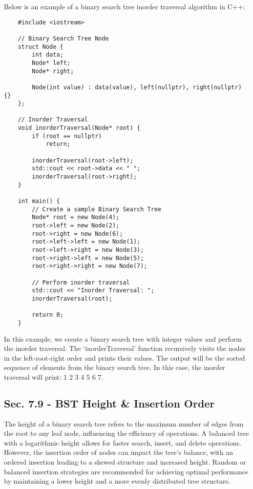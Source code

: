 \begin{solution}
    Below is an example of a binary search tree inorder traversal algorithm in C++:

    \horizontalline

    \begin{verbatim}
    #include <iostream>

    // Binary Search Tree Node
    struct Node {
        int data;
        Node* left;
        Node* right;
    
        Node(int value) : data(value), left(nullptr), right(nullptr) {}
    };
    
    // Inorder Traversal
    void inorderTraversal(Node* root) {
        if (root == nullptr)
            return;
    
        inorderTraversal(root->left);
        std::cout << root->data << " ";
        inorderTraversal(root->right);
    }
    
    int main() {
        // Create a sample Binary Search Tree
        Node* root = new Node(4);
        root->left = new Node(2);
        root->right = new Node(6);
        root->left->left = new Node(1);
        root->left->right = new Node(3);
        root->right->left = new Node(5);
        root->right->right = new Node(7);
    
        // Perform inorder traversal
        std::cout << "Inorder Traversal: ";
        inorderTraversal(root);
    
        return 0;
    }
    \end{verbatim}

    \horizontalline

    In this example, we create a binary search tree with integer values and perform the inorder traversal. The `inorderTraversal' function recursively visits the nodes in the left-root-right order and prints their values. The output will be the sorted sequence of elements from the binary search tree. In this case, the inorder 
    traversal will print: 1 2 3 4 5 6 7.
\end{solution}

\subsection*{Sec. 7.9 - BST Height \& Insertion Order}

The height of a binary search tree refers to the maximum number of edges from the root to any leaf node, influencing the efficiency of operations. A balanced tree with a logarithmic height allows for faster search, insert, and delete operations. However, the insertion order of nodes can impact the tree's balance, with an ordered insertion 
leading to a skewed structure and increased height. Random or balanced insertion strategies are recommended for achieving optimal performance by maintaining a lower height and a more evenly distributed tree structure.

